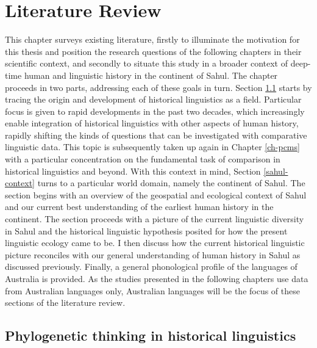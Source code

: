\chapter[Literature review]{Literature Review}
\label{ch-lit-review}


This chapter surveys existing literature, firstly to illuminate the motivation for this thesis and position the research questions of the following chapters in their scientific context, and secondly to situate this study in a broader context of deep-time human and linguistic history in the continent of Sahul. The chapter proceeds in two parts, addressing each of these goals in turn. Section \ref{academic-context} starts by tracing the origin and development of historical linguistics as a field. Particular focus is given to rapid developments in the past two decades, which increasingly enable integration of historical linguistics with other aspects of human history, rapidly shifting the kinds of questions that can be investigated with comparative linguistic data. This topic is subsequently taken up again in Chapter \ref{ch-pcms} with a particular concentration on the fundamental task of comparison in historical linguistics and beyond. With this context in mind, Section \ref{sahul-context} turns to a particular world domain, namely the continent of Sahul. The section begins with an overview of the geospatial and ecological context of Sahul and our current best understanding of the earliest human history in the continent. The section proceeds with a picture of the current linguistic diversity in Sahul and the historical linguistic hypothesis posited for how the present linguistic ecology came to be. I then discuss how the current historical linguistic picture reconciles with our general understanding of human history in Sahul as discussed previously. Finally, a general phonological profile of the languages of Australia is provided. As the studies presented in the following chapters use data from Australian languages only, Australian languages will be the focus of these sections of the literature review.

\hypertarget{academic-context}{%
\section{Phylogenetic thinking in historical linguistics}\label{academic-context}}

